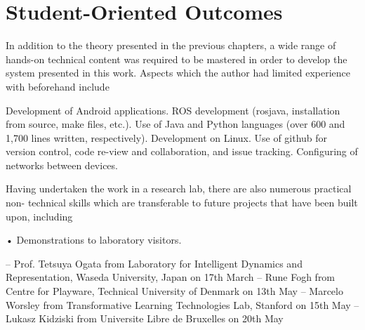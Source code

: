 \chapter{Student-Oriented Outcomes} \label{apppendix2}

In addition to the theory presented in the previous chapters, a wide range of hands-on technical
content was required to be mastered in order to develop the system presented in this work.
Aspects which the author had limited experience with beforehand include

Development of Android applications.
ROS development (rosjava, installation from source, make files, etc.).
Use of Java and Python languages (over 600 and 1,700 lines written, respectively).
Development on Linux.
Use of github for version control, code re-view and collaboration, and issue tracking.
Configuring of networks between devices.

Having undertaken the work in a research lab, there are also numerous practical non-
technical skills which are transferable to future projects that have been built upon, including


• Demonstrations to laboratory visitors.

– Prof. Tetsuya Ogata from Laboratory for Intelligent Dynamics and Representation, Waseda University, Japan on 17th March
– Rune Fogh from Centre for Playware, Technical University of Denmark on 13th May
– Marcelo Worsley from Transformative Learning Technologies Lab, Stanford on 15th May
– Lukasz Kidziski from Universite Libre de Bruxelles on 20th May